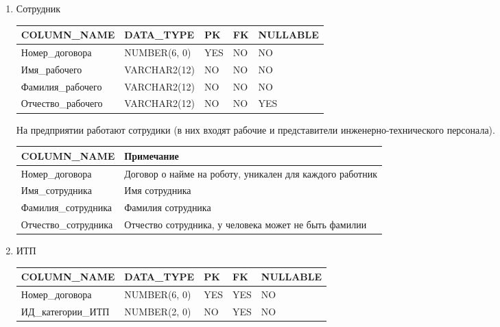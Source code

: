 \begin{enumerate}
    \item{Сотрудник}

    \begin{tabular}{|p{4cm}|p{3cm}|p{1cm}|p{1cm}|p{2cm}|} \hline

        {\bf COLUMN\_NAME} & {\bf DATA\_TYPE} & {\bf PK} & {\bf FK} & {\bf NULLABLE} \\ \hline
        Номер\_договора & NUMBER(6, 0) & YES & NO & NO \\ \hline
        Имя\_рабочего & VARCHAR2(12) & NO & NO & NO \\ \hline
        Фамилия\_рабочего & VARCHAR2(12) & NO & NO & NO \\ \hline
        Отчество\_рабочего & VARCHAR2(12) & NO & NO & YES \\ \hline

    \end{tabular}

    На предприятии работают сотрудики (в них входят рабочие и представители инженерно-технического персонала).

    \begin{tabular}{|p{4cm}|p{5cm}|} \hline

        {\bf COLUMN\_NAME} & {\bf Примечание} \\ \hline
        Номер\_договора &  Договор о найме на роботу, уникален для каждого работник \\ \hline
        Имя\_сотрудника &  Имя сотрудника \\ \hline
        Фамилия\_сотрудника & Фамилия сотрудника \\ \hline
        Отчество\_сотрудника & Отчество сотрудника, у человека может не быть фамилии \\ \hline

    \end{tabular}

    \item{ИТП}

    \begin{tabular}{|p{4cm}|p{3cm}|p{1cm}|p{1cm}|p{2cm}|} \hline

        {\bf COLUMN\_NAME} & {\bf DATA\_TYPE} & {\bf PK} & {\bf FK} & {\bf NULLABLE} \\ \hline
        Номер\_договора & NUMBER(6, 0) & YES & YES & NO \\ \hline
        ИД\_категории\_ИТП & NUMBER(2, 0) & NO & YES & NO \\ \hline


\end{tabular}
\end{enumerate}
